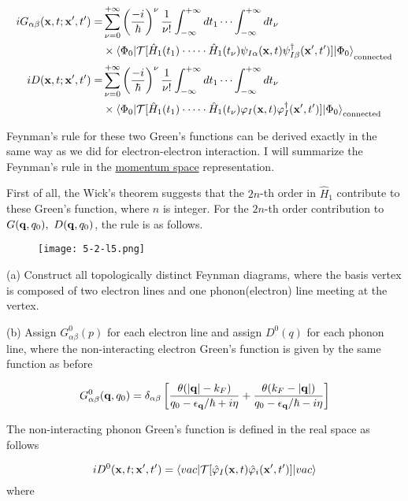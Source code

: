 \[\begin{split}
iG_{\alpha\beta}({\bf x},t;{\bf x'},t') =& \sum_{\nu = 0}^{+\infty}\left(\frac{-i}{\hbar}\right)^\nu\frac{1}{\nu!}\int_{-\infty}^{+\infty}dt_1\cdots\int_{-\infty}^{+\infty}dt_\nu\\
&\times {\langle\Phi_0|\mathcal{T}[\hat H_1(t_1)\cdot\cdots\cdot\hat H_1(t_\nu)\psi_{I\alpha}({\bf x},t)\psi_{I\beta}^
\dagger({\bf x'},t')]|\Phi_0\rangle}_{\text{connected}}\\
iD({\bf x},t;{\bf x'},t') =& \sum_{\nu = 0}^{+\infty}\left(\frac{-i}{\hbar}\right)^\nu\frac{1}{\nu!}\int_{-\infty}^{+\infty}dt_1\cdots\int_{-\infty}^{+\infty}dt_\nu\\
&\times {\langle\Phi_0|\mathcal{T}[\hat H_1(t_1)\cdot\cdots\cdot\hat H_1(t_\nu)\varphi_{I}({\bf x},t)\varphi_{I}^
\dagger({\bf x'},t')]|\Phi_0\rangle}_{\text{connected}}
\end{split} \]

Feynman's rule for these two Green's functions can be derived exactly in the same way as we did for electron-electron interaction. I will summarize the Feynman's rule in the \uline{momentum space} representation.

First of all, the Wick's theorem suggests that the $2n$-th order in $\hat{H}_1$ contribute to these Green's function, where $n$ is integer. For the $2n$-th order contribution to $G({\bf q},q_0),\ D({\bf q},q_0)$, the rule is as follows.

\begin{wrapfigure}{l}{4cm}
\texttt{[image: 5-2-l5.png]}
\end{wrapfigure}
\noindent (a) Construct all topologically distinct Feynman diagrams, where the basis vertex is composed of two electron lines and one phonon(electron) line meeting at the vertex.

\noindent (b) Assign $G_{\alpha\beta}^0(p)$ for each electron line and assign $D^0(q)$ for each phonon line, where the non-interacting electron Green's function is given by the same function as before

\[G_{\alpha\beta}^0({\bf q},q_0) = \delta_{\alpha\beta}\left[\frac{\theta(|{\bf q}|-k_F)}{q_0-\epsilon_{\bf q}/\hbar+i\eta} + \frac{\theta(k_F - |{\bf q}|)}{q_0-\epsilon_{\bf q}/\hbar-i\eta}\right] \]

The non-interacting phonon Green's function is defined in the real space as follows

\[iD^0({\bf x},t;{\bf x'},t') = \langle vac|\mathcal{T}[\hat\varphi_I({\bf x},t)\hat\varphi_i({\bf x'},t')]|vac\rangle \]
where

